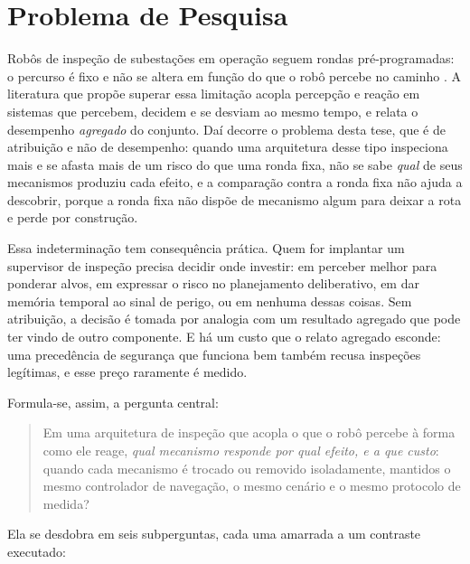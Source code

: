 \section{Problema de Pesquisa}
\label{sec:intro-problema}


Robôs de inspeção de subestações em operação seguem rondas pré-programadas: o percurso
é fixo e não se altera em função do que o robô percebe no caminho
\cite{TJH2b2023Trends,Liu2016VisualNavSubstation}. A literatura que propõe superar essa
limitação acopla percepção e reação em sistemas que percebem, decidem e se desviam ao
mesmo tempo, e relata o desempenho \emph{agregado} do conjunto. Daí decorre o problema
desta tese, que é de atribuição e não de desempenho: quando uma arquitetura desse tipo
inspeciona mais e se afasta mais de um risco do que uma ronda fixa, não se sabe
\emph{qual} de seus mecanismos produziu cada efeito, e a comparação contra a ronda
fixa não ajuda a descobrir, porque a ronda fixa não dispõe de mecanismo algum para
deixar a rota e perde por construção.

Essa indeterminação tem consequência prática. Quem for implantar um supervisor de
inspeção precisa decidir onde investir: em perceber melhor para ponderar alvos, em
expressar o risco no planejamento deliberativo, em dar memória temporal ao sinal de
perigo, ou em nenhuma dessas coisas. Sem atribuição, a decisão é tomada por analogia
com um resultado agregado que pode ter vindo de outro componente. E há um custo que o
relato agregado esconde: uma precedência de segurança que funciona bem também recusa
inspeções legítimas, e esse preço raramente é medido.

Formula-se, assim, a pergunta central:

\begin{quote}
Em uma arquitetura de inspeção que acopla o que o robô percebe à forma como ele reage,
\emph{qual mecanismo responde por qual efeito, e a que custo}: quando cada mecanismo
é trocado ou removido isoladamente, mantidos o mesmo controlador de navegação, o mesmo
cenário e o mesmo protocolo de medida?
\end{quote}

Ela se desdobra em seis subperguntas, cada uma amarrada a um contraste executado:

